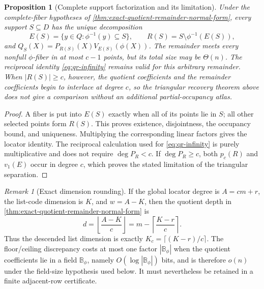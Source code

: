\documentclass[12pt,a4paper]{amsart}
\numberwithin{equation}{section}
\newtheorem{proposition}[proposition]{Proposition}
\theoremstyle{remark}
\newtheorem{remark}[remark]{Remark}
\newcommand{\B}{\mathbb B}
\newcommand{\abs}[1]{\lvert #1\rvert}
\begin{document}
\begin{proposition}[Complete support factorization and its limitation]
\label{prop:complete-support-factorization}
Under the complete-fiber hypotheses of
\cref{thm:exact-quotient-remainder-normal-form}, every support
\(S\subseteq D\) has the unique decomposition
\[
 E(S)=\{y\in Q:\phi^{-1}(y)\subseteq S\},\qquad
 R(S)=S\setminus\phi^{-1}(E(S)),
 \tag{QR5a}\label{eq:complete-support-factorization}
\]
and
\(Q_S(X)=P_{R(S)}(X)V_{E(S)}(\phi(X))\).  The remainder meets every
nonfull \(\phi\)-fiber in at most \(c-1\) points, but its total size may
be \(\Theta(n)\).  The reciprocal identity \eqref{eq:qr-infinity} remains
valid for this arbitrary remainder.  When \(\abs{R(S)}\ge c\), however,
the quotient coefficients and the remainder coefficients begin to
interlace at degree \(c\), so the triangular recovery theorem above does
not give a comparison without an additional partial-occupancy atlas.
\end{proposition}

\begin{proof}
A fiber is put into \(E(S)\) exactly when all of its points lie in \(S\);
all other selected points form \(R(S)\).  This proves existence,
disjointness, the occupancy bound, and uniqueness.  Multiplying the
corresponding linear factors gives the locator identity.  The reciprocal
calculation used for \eqref{eq:qr-infinity} is purely multiplicative and
does not require \(\deg P_R<c\).  If \(\deg P_R\ge c\), both
\(p_c(R)\) and \(v_1(E)\) occur in degree \(c\), which proves the stated
limitation of the triangular separation.
\end{proof}

\begin{remark}[Exact dimension rounding]
\label{rem:qr-rounding}
If the global locator degree is $A=cm+r$, the list-code dimension is $K$,
and $w=A-K$, then the quotient depth in
\cref{thm:exact-quotient-remainder-normal-form} is
\[
 d=\left\lfloor\frac{A-K}{c}\right\rfloor
   =m-\left\lceil\frac{K-r}{c}\right\rceil.         \tag{QR5b}\label{eq:qr-rounding}
\]
Thus the descended list dimension is exactly
\(K_c=\lceil(K-r)/c\rceil\).  The floor/ceiling discrepancy costs at most
one factor $|\B_\phi|$ when the quotient coefficients lie in a field
$\B_\phi$, namely $O(\log|\B_\phi|)$ bits, and is therefore
$o(n)$ under the field-size hypothesis used below.  It must nevertheless
be retained in a finite adjacent-row certificate.
\end{remark}
\end{document}
